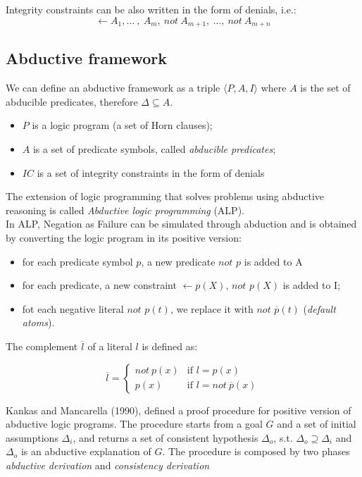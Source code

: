 Integrity constraints can be also written in the form of denials, i.e.:
 \[ \leftarrow A_1, \dots\ ,\ A_m,\ not\ A_{m+1},\ \dots,\ not\ A_{m+n}\]

\subsection{Abductive framework}%

We can define an abductive framework as a triple $\langle P, A , I\rangle $ 
where $A$ is the set of abducible predicates, therefore $\Delta \subseteq A$.

\begin{itemize}
    \item $P$ is a logic program (a set of Horn clauses);
    \item $A$ is a set of predicate symbols, called \textit{abducible predicates};
    \item $IC$ is a set of integrity constraints in the form of denials
\end{itemize}

The extension of logic programming that solves problems using abductive reasoning is called \textit{Abductive logic programming} (ALP). \\
In ALP, Negation as Failure can be simulated through abduction and is obtained by converting the logic program in its positive version:

\begin{itemize}
    \item for each predicate symbol $p$, a new predicate $not$ $p$ is added to A
    \item for each predicate, a new constraint $ \leftarrow p(X)$, $not$ $p(X)$ is added to I;
    \item fot each negative literal $not$ $p(t)$, we replace it with $not$ $\overline{p}(t)$ (\textit{default atoms}).
\end{itemize}

The complement $\overline{l}$ of a literal $l$ is defined as:

\begin{equation}
    \overline{l} = 
    \begin{cases}
        not \ p(x) & \text{if } l = p(x) \\
        p(x) & \text{if } l = not \ \overline{p}(x)
    \end{cases}
\end{equation}

Kankas and Mancarella (1990), defined a proof procedure for positive version of abductive logic programs.
The procedure starts from a goal $G$ and a set of initial assumptions $\Delta_i$, and returns a set of consistent hypothesis $\Delta_o$, s.t. $\Delta_o \supseteq \Delta_i$ and $\Delta_o$ is an abductive explanation of $G$.
The procedure is composed by two phases \textit{abductive derivation} and \textit{consistency derivation} 

